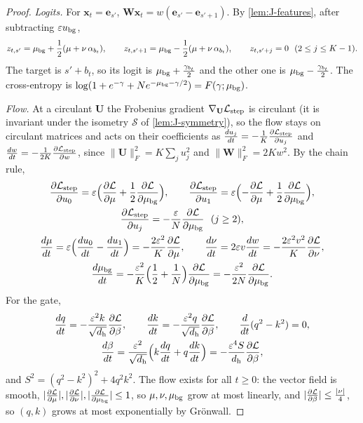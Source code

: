 \begin{proof}
\emph{Logits.} For $\bm x_t=\bm e_{s'}$, $\mathbf W\bm x_t=w(\bm e_{s'}-\bm e_{s'+1})$. By \cref{lem:J-features}, after subtracting $\varepsilon u_{\mathrm{bg}}$,
\[
 z_{t,s'}=\cbg+\tfrac{1}{2}(\cnt+\nu\,\alpha_{b_t}),\qquad z_{t,s'+1}=\cbg-\tfrac{1}{2}(\cnt+\nu\,\alpha_{b_t}),\qquad z_{t,s'+j}=0\ \ (2\le j\le K-1).
\]
The target is $s'+b_t$, so its logit is $\mu_{\mathrm{bg}}+\frac{\gamma_{b_t}}{2}$ and the other one is $\mu_{\mathrm{bg}}-\frac{\gamma_{b_t}}{2}$. The cross-entropy is
$\log(1+e^{-\gamma}+Ne^{-\mu_{\mathrm{bg}}-\gamma/2})=F(\gamma;\mu_{\mathrm{bg}})$.

\emph{Flow.} At a circulant $\mathbf U$ the Frobenius gradient $\nabla_{\mathbf U}\mathcal L_{\mathrm{step}}$ is circulant (it is invariant under the isometry $\mathcal S$ of
\cref{lem:J-symmetry}), so the flow stays on circulant matrices and acts on their coefficients as $\ddt{u_j}=-\frac{1}{K}\pd{\Lstep}{u_j}$ and $\ddt{w}=-\frac{1}{2K}\pd{\Lstep}{w}$, since
$\|\mathbf U\|_F^2=K\sum_ju_j^2$ and $\|\mathbf W\|_F^2=2Kw^2$. By the chain rule,
\begin{gather*}
 \pd{\Lstep}{u_0}=\initscale\Bigl(\pd{\mathcal L}{\cnt}+\tfrac{1}{2}\pd{\mathcal L}{\cbg}\Bigr),\qquad \pd{\Lstep}{u_1}=\initscale\Bigl(-\pd{\mathcal L}{\cnt}+\tfrac{1}{2}\pd{\mathcal L}{\cbg}\Bigr),\\
 \pd{\Lstep}{u_j}=-\frac{\initscale}{N}\pd{\mathcal L}{\cbg}\ \ (j\ge2),\\
 \ddt{\cnt}=\initscale\Bigl(\ddt{u_0}-\ddt{u_1}\Bigr)=-\frac{2\initscale^2}{K}\pd{\mathcal L}{\cnt},\qquad
 \ddt{\nu}=2\initscale v\ddt{w}=-\frac{2\initscale^2v^2}{K}\pd{\mathcal L}{\nu},\\
 \ddt{\cbg}=-\frac{\initscale^2}{K}\Bigl(\frac{1}{2}+\frac{1}{N}\Bigr)\pd{\mathcal L}{\cbg}=-\frac{\initscale^2}{2N}\pd{\mathcal L}{\cbg}.
\end{gather*}
For the gate,
\begin{gather*}
 \ddt{q}=-\frac{\initscale^2k}{\sqrt{d_{\mathrm h}}}\pd{\mathcal L}{\beta},\qquad \ddt{k}=-\frac{\initscale^2q}{\sqrt{d_{\mathrm h}}}\pd{\mathcal L}{\beta},\qquad \frac{d}{dt}(q^2-k^2)=0,\\
 \ddt{\beta}=\frac{\initscale^2}{\sqrt{d_{\mathrm h}}}\Bigl(k\ddt{q}+q\ddt{k}\Bigr)=-\frac{\initscale^4S}{d_{\mathrm h}}\pd{\mathcal L}{\beta},
\end{gather*}
and $S^2=(q^2-k^2)^2+4q^2k^2$. The flow exists for all $t\ge0$: the vector field is smooth, $|\pd{\mathcal L}{\cnt}|,|\pd{\mathcal L}{\nu}|,|\pd{\mathcal L}{\cbg}|\le1$, so
$\mu,\nu,\mu_{\mathrm{bg}}$ grow at most linearly, and $|\pd{\mathcal L}{\beta}|\le\frac{|\nu|}{4}$, so $(q,k)$ grows at most exponentially by Gr\"onwall.
\end{proof}

